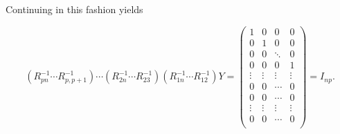 \documentclass{article}
\begin{document}
Continuing in this fashion yields

\begin{equation}
(R_{pn}^{-1} \cdots R_{p,p+1}^{-1})
\cdots
(R_{2n}^{-1} \cdots R_{23}^{-1})
(R_{1n}^{-1} \cdots R_{12}^{-1}) Y 
=
\begin{pmatrix}
1 & 0 & 0 & 0\\
0 & 1 & 0 & 0\\
0 & 0 & \ddots & 0\\
0 & 0 & 0 & 1\\
\vdots & \vdots & \vdots & \vdots\\
0 & 0 & \cdots & 0\\
0 & 0 & \cdots & 0\\
\vdots & \vdots & \vdots & \vdots\\
0 & 0 & \cdots & 0\\
\end{pmatrix}
=
I_{np}.
\end{equation}
\end{document}
